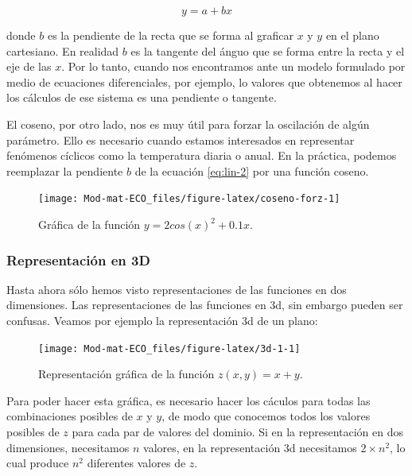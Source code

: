 \documentclass[
]{book}
\begin{document}
\begin{equation}
    y = a + bx \label{eq:lin-2}
\end{equation}

donde \(b\) es la pendiente de la recta que se forma al graficar \(x\) y \(y\) en el plano cartesiano. En realidad \(b\) es la tangente del ánguo que se forma entre la recta y el eje de las \(x\). Por lo tanto, cuando nos encontramos ante un modelo formulado por medio de ecuaciones diferenciales, por ejemplo, lo valores que obtenemos al hacer los cálculos de ese sistema es una pendiente o tangente.

El coseno, por otro lado, nos es muy útil para forzar la oscilación de algún parámetro. Ello es necesario cuando estamos interesados en representar fenómenos cíclicos como la temperatura diaria o anual. En la práctica, podemos reemplazar la pendiente \(b\) de la ecuación \eqref{eq:lin-2} por una función coseno.

\begin{figure}

{\centering \texttt{[image: Mod-mat-ECO\_files/figure-latex/coseno-forz-1]} 

}

\caption{Gráfica de la función $y = 2 cos(x)^2 + 0.1  x$.}\label{fig:coseno-forz}
\end{figure}

\hypertarget{representaciuxf3n-en-3d}{%
\subsubsection{Representación en 3D}\label{representaciuxf3n-en-3d}}

Hasta ahora sólo hemos visto representaciones de las funciones en dos dimensiones. Las representaciones de las funciones en 3d, sin embargo pueden ser confusas. Veamos por ejemplo la representación 3d de un plano:

\begin{figure}

{\centering \texttt{[image: Mod-mat-ECO\_files/figure-latex/3d-1-1]} 

}

\caption{Representación gráfica de la función $z(x, y) = x + y$.}\label{fig:3d-1}
\end{figure}

Para poder hacer esta gráfica, es necesario hacer los cáculos para todas las combinaciones posibles de \(x\) y \(y\), de modo que conocemos todos los valores posibles de \(z\) para cada par de valores del dominio. Si en la representación en dos dimensiones, necesitamos \(n\) valores, en la representación 3d necesitamos \(2 \times n^2\), lo cual produce \(n^2\) diferentes valores de \(z\).
\end{document}
